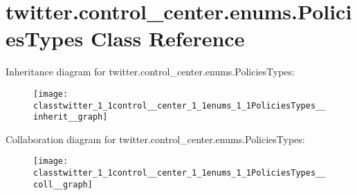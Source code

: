 \hypertarget{classtwitter_1_1control__center_1_1enums_1_1PoliciesTypes}{}\section{twitter.\+control\+\_\+center.\+enums.\+Policies\+Types Class Reference}
\label{classtwitter_1_1control__center_1_1enums_1_1PoliciesTypes}


Inheritance diagram for twitter.\+control\+\_\+center.\+enums.\+Policies\+Types\+:
\nopagebreak
\begin{figure}[H]
\begin{center}
\leavevmode
\texttt{[image: classtwitter\_1\_1control\_\_center\_1\_1enums\_1\_1PoliciesTypes\_\_inherit\_\_graph]}
\end{center}
\end{figure}


Collaboration diagram for twitter.\+control\+\_\+center.\+enums.\+Policies\+Types\+:
\nopagebreak
\begin{figure}[H]
\begin{center}
\leavevmode
\texttt{[image: classtwitter\_1\_1control\_\_center\_1\_1enums\_1\_1PoliciesTypes\_\_coll\_\_graph]}
\end{center}
\end{figure}

